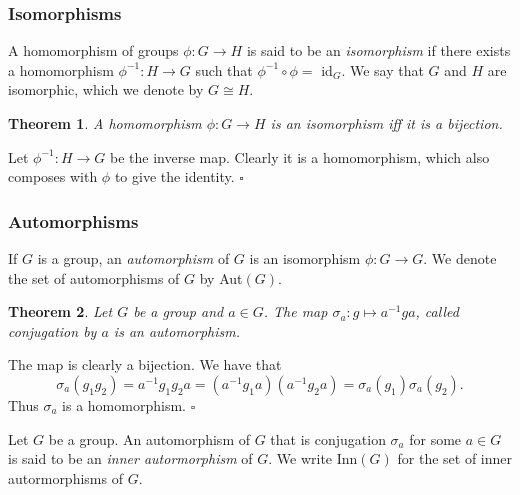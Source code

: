 \documentclass[10pt]{article}
\newtheorem{theorem}{Theorem}[section]
\newenvironment{proof}[1][Proof]{\begin{trivlist}
\item[\hskip \labelsep {\itshape #1}]}{\end{trivlist}}
\newenvironment{definition}[1][Definition]{\begin{trivlist}
\item[\hskip \labelsep {\bfseries #1}]}{\end{trivlist}}
\begin{document}
\subsubsection{Isomorphisms}

\begin{definition}
A homomorphism of groups $\phi : G \to H$ is said to be an \emph{isomorphism} if there exists a homomorphism $\phi^{-1} : H \to G$ such that $\phi^{-1}\circ \phi =$ id$_G$. We say that $G$ and $H$ are isomorphic, which we denote by $G \cong H$.
\end{definition}

\begin{theorem}
A homomorphism $\phi : G \to H$ is an isomorphism iff it is a bijection.
\end{theorem}

\begin{proof}
Let $\phi^{-1} : H \to G$ be the inverse map. Clearly it is a homomorphism, which also composes with $\phi$ to give the identity. $\square$
\end{proof}

\subsubsection{Automorphisms}

\begin{definition}
If $G$ is a group, an \emph{automorphism} of $G$ is an isomorphism $\phi : G \to G$. We denote the set of automorphisms of $G$ by Aut$(G)$.
\end{definition}

\begin{theorem}
Let $G$ be a group and $a \in G$. The map $\sigma_a : g \mapsto a^{-1}ga$, called \emph{conjugation} by $a$ is an automorphism.
\end{theorem}

\begin{proof}
The map is clearly a bijection. We have that
$$\sigma_a(g_1g_2) = a^{-1}g_1g_2a = (a^{-1}g_1a)(a^{-1}g_2a) = \sigma_a(g_1)\sigma_a(g_2).$$
Thus $\sigma_a$ is a homomorphism. $\square$
\end{proof}

\begin{definition}
Let $G$ be a group. An automorphism of $G$ that is conjugation $\sigma_a$ for some $a \in G$ is said to be an \emph{inner autormorphism} of $G$. We write Inn$(G)$ for the set of inner autormorphisms of $G$.
\end{definition}
\end{document}
